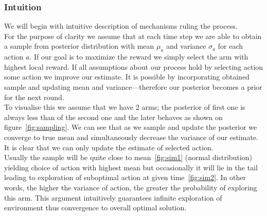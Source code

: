 \documentclass[12pt, a4paper, pdflatex, leqno]{report}
\begin{document}
\subsubsection{Intuition}
We will begin with intuitive description of mechanisms ruling the process.\\
For the purpose of clarity we assume that at each time step we are able to obtain a sample from posterior distribution with mean $\mu_a$ and variance $\sigma_a$ for each action $a$. If our goal is to maximize the reward we simply select the arm with highest local reward. If all assumptions about our process hold by selecting action some action we improve our estimate. It is possible by incorporating obtained sample and updating mean and variance---therefore our posterior becomes a prior for the next round.\\

To visualise this we assume that we have 2 arms; the posterior of first one is always less than of the second one and the later behaves as shown on figure~\ref{fig:sampling}. We can see that as we sample and update the posterior we converge to true mean and simultaneously decrease the variance of our estimate.\\

It is clear that we can only update the estimate of selected action.\\
Usually the sample will be quite close to mean~\ref{fig:sim1} (normal distribution) yielding choice of action with highest mean but occasionally it will lie in the tail leading to exploration of suboptimal action at given time~\ref{fig:sim2}. In other words, the higher the variance of action, the greater the probability of exploring this arm. This argument intuitively guarantees infinite exploration of environment thus convergence to overall optimal solution.
\end{document}
